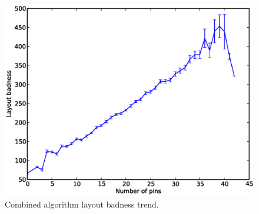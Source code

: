 \begin{figure}[H]
\begin{center}
\includegraphics[width=\textwidth]{Images/final_algorithm_badness_trend.eps}
\caption{Combined algorithm layout badness trend.}
\label{fig:final_badness_trend}
\end{center}
\end{figure}
